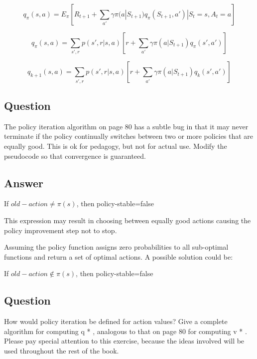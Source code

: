 \documentclass[11pt]{article}
\begin{document}
    \begin{equation}
        q_{\pi}(s, a) = E_\pi [R_{t+1} + \sum_{a'}  \gamma  \pi(a|S_{t+1}) q_{\pi} (S_{t+1}, a') | S_t = s, A_t = a]
    \end{equation}

    \begin{equation}
        q_{\pi}(s, a) = \sum_{s',r} p(s', r | s, a) [r + \sum_{a'} \gamma \pi(a|S_{t+1}) q_\pi(s', a')]
    \end{equation}

    \begin{equation}
        \label{eqn:eq4_5}
        q_{k+1}(s, a) = \sum_{s',r} p(s', r | s, a) [r + \sum_{a'} \gamma \pi(a|S_{t+1}) q_k(s', a')]
    \end{equation}

    \subsection{Question}

    The policy iteration algorithm on page 80 has a subtle bug in that it may never terminate if the policy continually switches between two or more policies that are equally good.
    This is ok for pedagogy, but not for actual use.
    Modify the pseudocode so that convergence is guaranteed.

    \subsection*{Answer}

    If $old-action \neq \pi(s)$, then policy-stable=false

    This expression may result in choosing between equally good actions causing the policy improvement step not to stop.

    Assuming the policy function assigns zero probabilities to all sub-optimal functions and return a set of optimal actions. A possible solution could be:

    If $old-action \notin \pi(s)$, then policy-stable=false

    \subsection{Question}

    How would policy iteration be defined for action values?
    Give a complete algorithm for computing q * , analogous to that on page 80 for computing v * .
    Please pay special attention to this exercise, because the ideas involved will be used throughout the rest of the book.
\end{document}
